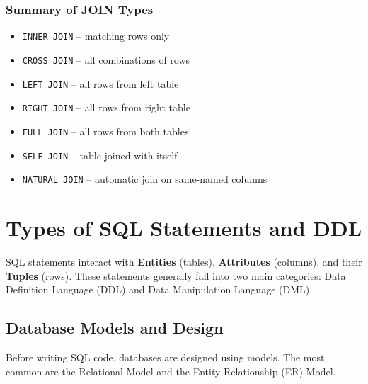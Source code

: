 \documentclass{article}
\begin{document}
\subsubsection{Summary of JOIN Types}

\begin{itemize}
    \item \texttt{INNER JOIN} – matching rows only
    \item \texttt{CROSS JOIN} – all combinations of rows
    \item \texttt{LEFT JOIN} – all rows from left table
    \item \texttt{RIGHT JOIN} – all rows from right table
    \item \texttt{FULL JOIN} – all rows from both tables
    \item \texttt{SELF JOIN} – table joined with itself
    \item \texttt{NATURAL JOIN} – automatic join on same-named columns
\end{itemize}






























\newpage

\section{Types of SQL Statements and DDL}

SQL statements interact with \textbf{Entities} (tables), \textbf{Attributes} (columns), and their \textbf{Tuples} (rows). These statements generally fall into two main categories: Data Definition Language (DDL) and Data Manipulation Language (DML).

\subsection{Database Models and Design}

Before writing SQL code, databases are designed using models. The most common are the Relational Model and the Entity-Relationship (ER) Model.
\end{document}

